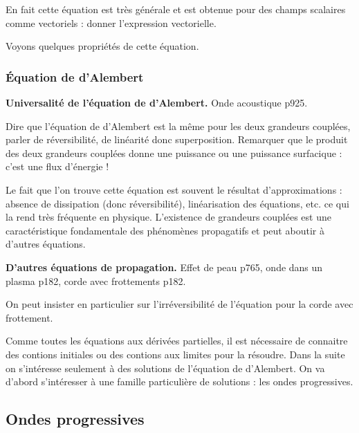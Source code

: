 En fait cette équation est très générale et est obtenue pour des champs scalaires comme vectoriels : donner l'expression vectorielle.

\begin{transition}
Voyons quelques propriétés de cette équation.
\end{transition}

\subsubsection{Équation de d'Alembert}

\begin{slide}
\textbf{Universalité de l'équation de d'Alembert.}
Onde acoustique \cite{Sanz2016} p925.
\end{slide}

Dire que l'équation de d'Alembert est la même pour les deux grandeurs couplées, parler de réversibilité, de linéarité donc superposition.
Remarquer que le produit des deux grandeurs couplées donne une puissance ou une puissance surfacique : c'est une flux d'énergie !

Le fait que l'on trouve cette équation est souvent le résultat d'approximations : absence de dissipation (donc réversibilité), linéarisation des équations, etc. ce qui la rend très fréquente en physique.
L'existence de grandeurs couplées est une caractéristique fondamentale des phénomènes propagatifs et peut aboutir à d'autres équations.

\begin{slide}
\textbf{D'autres équations de propagation.}
Effet de peau \cite{Olivier2000} p765, onde dans un plasma \cite{Brebec2004} p182, corde avec frottements \cite{Brebec2004} p182.
\end{slide}

On peut insister en particulier sur l'irréversibilité de l'équation pour la corde avec frottement.

\begin{transition}
Comme toutes les équations aux dérivées partielles, il est nécessaire de connaitre des contions initiales ou des contions aux limites pour la résoudre.
Dans la suite on s'intéresse seulement à des solutions de l'équation de d'Alembert.
On va d'abord s'intéresser à une famille particulière de solutions : les ondes progressives.
\end{transition}

\subsection{Ondes progressives}

